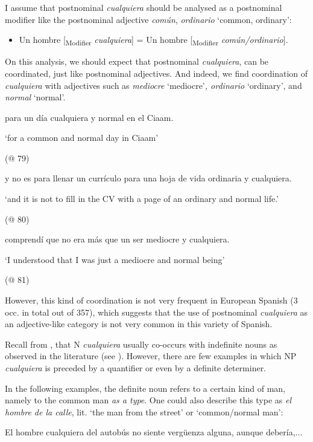 I assume that postnominal \textit{cualquiera} should be analysed as a postnominal modifier like the postnominal adjective \textit{común}, \textit{ordinario} ‘common, ordinary’:

\begin{itemize}
\item Un hombre [\textsubscript{Modifier} \textit{cualquiera}] = Un hombre [\textsubscript{Modifier} \textit{común/ordinario}]. 
\end{itemize}

On this analysis, we should expect that postnominal \textit{cualquiera}, can be coordinated, just like postnominal adjectives. And indeed, we find coordination of \textit{cualquiera} with adjectives such as \textit{mediocre} ‘mediocre’\textit{, ordinario} ‘ordinary’, and \textit{normal} ‘normal’.

  para un día cualquiera y normal en el Ciaam. 

  ‘for a common and normal day in Ciaam’

  (@ 79)

  y no es para llenar un currículo para una hoja de vida ordinaria y cualquiera.

  ‘and it is not to fill in the CV with a page of an ordinary and normal life.’

  (@ 80)

  comprendí que no era más que un ser mediocre y cualquiera. 

  ‘I understood that I was just a mediocre and normal being’

  (@ 81)

However, this kind of coordination is not very frequent in European Spanish (3 occ. in total out of 357), which suggests that the use of postnominal \textit{cualquiera} as an adjective-like category is not very common in this variety of Spanish.

  Recall from , that N \textit{cualquiera} usually co-occurs with indefinite nouns as observed in the literature (see ). However, there are few examples in which NP \textit{cualquiera} is preceded by a quantifier or even by a definite determiner.

  In the following examples, the definite noun refers to a certain kind of man, namely to the common man \textit{as a type}. One could also describe this type as \textit{el hombre de la calle}, lit. ‘the man from the street’ or ‘common/normal man’:

  El hombre cualquiera del autobús no siente vergüenza alguna, aunque debería,...


